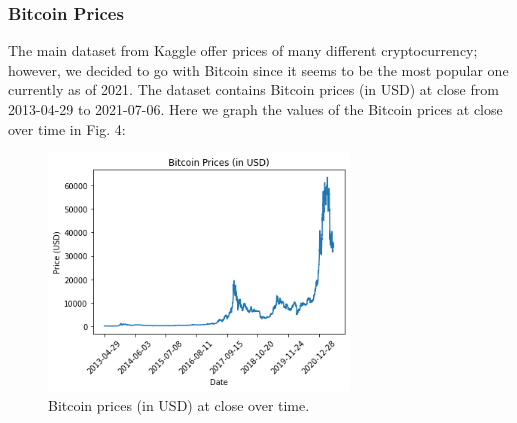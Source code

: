 \documentclass[letterpaper, 10 pt, conference]{ieeeconf}  %
\begin{document}
      \subsubsection{Bitcoin Prices} The main dataset from Kaggle offer prices of many different cryptocurrency; however, we decided to go with Bitcoin since it seems to be the most popular one currently as of 2021. The dataset contains Bitcoin prices (in USD) at close from 2013-04-29 to 2021-07-06. Here we graph the values of the Bitcoin prices at close over time in Fig. 4:

      \begin{figure}[thpb]
          \centering
          \includegraphics[width=8cm]{4.png}
          \caption{Bitcoin prices (in USD) at close over time.}
          \label{figurelabel}
       \end{figure}
\end{document}
